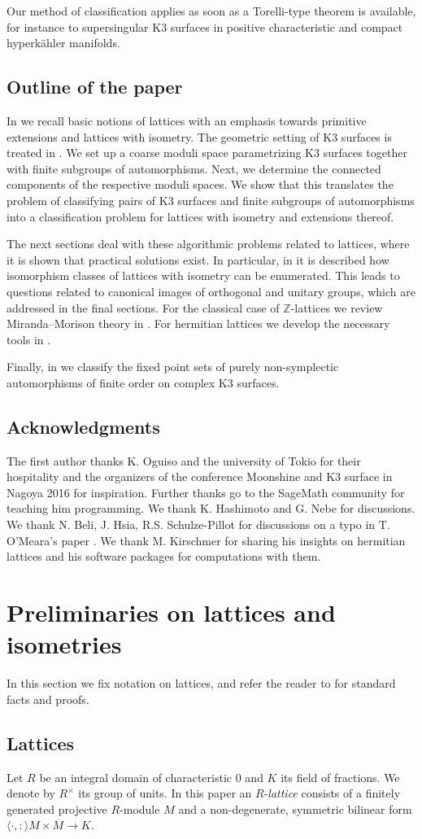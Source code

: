 \documentclass[a4paper]{amsart}
\theoremstyle{definition}
\theoremstyle{plain}
\newcommand{\ZZ}{\mathbb{Z}}
\newcommand{\sprodb}[2]{\langle #1, #2 \rangle}
\def\ackintro{%
\subsection*{Acknowledgments}
The first author thanks K. Oguiso and the university of Tokio for their hospitality and the organizers of the conference Moonshine and K3 surface in Nagoya 2016 for inspiration. Further thanks go to the SageMath community for teaching him programming.
We thank K. Hashimoto and G. Nebe for discussions.
We thank N. Beli, J. Hsia, R.S. Schulze-Pillot for discussions on a typo in T. O'Meara's paper \cite{omeara1958}. We thank M. Kirschmer for sharing his insights on hermitian lattices and his software packages \cite{kirschmer_software} for computations with them.
}
\begin{document}
Our method of classification applies as soon as a Torelli-type theorem is available, for instance
to supersingular K3 surfaces in positive characteristic and compact hyperk\"ahler manifolds.


\subsection*{Outline of the paper}

In  we recall basic notions of lattices with an emphasis towards primitive extensions and lattices with isometry.
The geometric setting of K3 surfaces is treated in . We set up a coarse moduli space
parametrizing K3 surfaces together with finite subgroups of automorphisms. Next, we determine the connected components of the respective moduli spaces.
We show that this translates the problem of classifying pairs of K3 surfaces and finite subgroups of automorphisms
into a classification problem for lattices with isometry and extensions thereof.

The next sections deal with these algorithmic problems related to lattices, where it is shown that practical solutions exist.
In particular, in  it is described how isomorphism classes of lattices with isometry can be enumerated.
This leads to questions related to canonical images of orthogonal and unitary groups, which are addressed in the final sections. For the classical case of $\ZZ$-lattices we review Miranda--Morison theory in . For hermitian lattices we develop the necessary tools in .

Finally, in  we classify the fixed point sets of purely non-symplectic automorphisms of finite order on complex K3 surfaces.

\ackintro

\section{Preliminaries on lattices and isometries}\label{sec:lat}
In this section we fix notation on lattices, and refer the reader to \cite{nikulin1980_forms,splag, kneser2002} for standard facts and proofs.

\subsection{Lattices}\label{sect:lattices}
Let $R$ be an integral domain of characteristic $0$ and $K$ its field of fractions.
We denote by $R^\times$ its group of units.
In this paper an $R$-\emph{lattice} consists of a finitely generated projective $R$-module $M$ and
a non-degenerate, symmetric bilinear form $\sprodb{\cdot} \colon M \times M \to K$.
\end{document}
